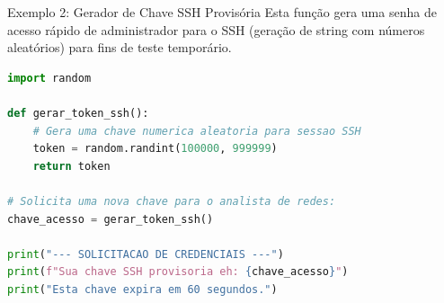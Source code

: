\begin{frame}[fragile]{Exemplo 2: Gerador de Chave SSH Provisória}
    Esta função gera uma senha de acesso rápido de administrador para o SSH (geração de string com números aleatórios) para fins de teste temporário.
    
    \begin{lstlisting}[language=Python]
import random

def gerar_token_ssh():
    # Gera uma chave numerica aleatoria para sessao SSH
    token = random.randint(100000, 999999)
    return token

# Solicita uma nova chave para o analista de redes:
chave_acesso = gerar_token_ssh()

print("--- SOLICITACAO DE CREDENCIAIS ---")
print(f"Sua chave SSH provisoria eh: {chave_acesso}")
print("Esta chave expira em 60 segundos.")
    \end{lstlisting}
\end{frame}
